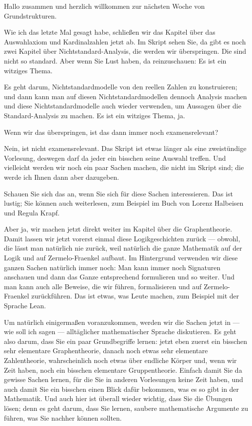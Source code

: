 \begin{spoken-clean}[00:00:00 - 00:01:08]
Hallo zusammen und herzlich willkommen zur nächsten Woche von Grundstrukturen.

Wie ich das letzte Mal gesagt habe, schließen wir das Kapitel über das Auswahlaxiom und Kardinalzahlen jetzt ab. Im Skript sehen Sie, da gibt es noch zwei Kapitel über Nichtstandard-Analysis, die werden wir überspringen. Die sind nicht so standard. Aber wenn Sie Lust haben, da reinzuschauen: Es ist ein witziges Thema.

Es geht darum, Nichtstandardmodelle von den reellen Zahlen zu konstruieren; und dann kann man auf diesen Nichtstandardmodellen dennoch Analysis machen und diese Nichtstandardmodelle auch wieder verwenden, um Aussagen über die Standard-Analysis zu machen. Es ist ein witziges Thema, ja.
\end{spoken-clean}

\begin{student-interaction}[Studentenfrage]
Wenn wir das überspringen, ist das dann immer noch examensrelevant?
\end{student-interaction}

\begin{spoken-clean}[00:01:08 - 00:03:08]
Nein, ist nicht examensrelevant. Das Skript ist etwas länger als eine zweistündige Vorlesung, deswegen darf da jeder ein bisschen seine Auswahl treffen. Und vielleicht werden wir noch ein paar Sachen machen, die nicht im Skript sind; die werde ich Ihnen dann aber dazugeben.

Schauen Sie sich das an, wenn Sie sich für diese Sachen interessieren. Das ist lustig; Sie können auch weiterlesen, zum Beispiel im Buch von Lorenz Halbeisen und Regula Krapf.

Aber ja, wir machen jetzt direkt weiter im Kapitel über die Graphentheorie. Damit lassen wir jetzt vorerst einmal diese Logikgeschichten zurück --- obwohl, die lässt man natürlich nie zurück, weil natürlich die ganze Mathematik auf der Logik und auf Zermelo-Fraenkel aufbaut. Im Hintergrund verwenden wir diese ganzen Sachen natürlich immer noch: Man kann immer noch Signaturen anschauen und dann das Ganze entsprechend formulieren und so weiter. Und man kann auch alle Beweise, die wir führen, formalisieren und auf Zermelo-Fraenkel zurückführen. Das ist etwas, was Leute machen, zum Beispiel mit der Sprache Lean.

Um natürlich einigermaßen voranzukommen, werden wir die Sachen jetzt in --- wie soll ich sagen --- alltäglicher mathematischer Sprache diskutieren. Es geht also darum, dass Sie ein paar Grundbegriffe lernen: jetzt eben zuerst ein bisschen sehr elementare Graphentheorie, danach noch etwas sehr elementare Zahlentheorie, wahrscheinlich noch etwas über endliche Körper und, wenn wir Zeit haben, noch ein bisschen elementare Gruppentheorie. Einfach damit Sie da gewisse Sachen lernen, für die Sie in anderen Vorlesungen keine Zeit haben, und auch damit Sie ein bisschen einen Blick dafür bekommen, was es so gibt in der Mathematik. Und auch hier ist überall wieder wichtig, dass Sie die Übungen lösen; denn es geht darum, dass Sie lernen, saubere mathematische Argumente zu führen, was Sie nachher können sollten.
\end{spoken-clean}

